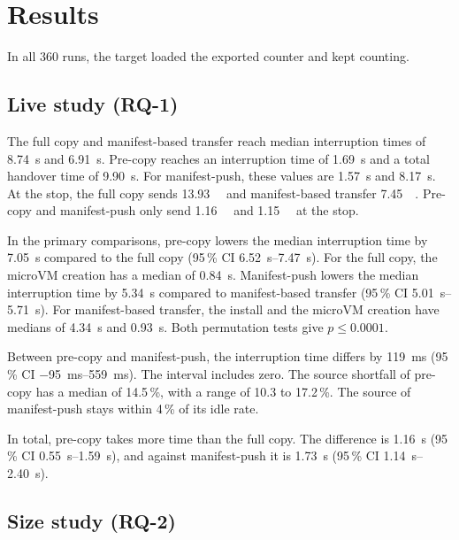 \section{Results}
\label{sec:results}

In all 360 runs, the target loaded the exported counter and kept counting.

\subsection{Live study (RQ-1)}

The full copy and manifest-based transfer reach median interruption times of \SI{8.74}{\second} and \SI{6.91}{\second}. Pre-copy reaches an interruption time of \SI{1.69}{\second} and a total handover time of \SI{9.90}{\second}. For manifest-push, these values are \SI{1.57}{\second} and \SI{8.17}{\second}. At the stop, the full copy sends \SI{13.93}{\mega\byte} and manifest-based transfer \SI{7.45}{\kilo\byte}. Pre-copy and manifest-push only send \SI{1.16}{\kilo\byte} and \SI{1.15}{\kilo\byte} at the stop.

In the primary comparisons, pre-copy lowers the median interruption time by \SI{7.05}{\second} compared to the full copy (95\,\% CI \SIrange{6.52}{7.47}{\second}). For the full copy, the microVM creation has a median of \SI{0.84}{\second}. Manifest-push lowers the median interruption time by \SI{5.34}{\second} compared to manifest-based transfer (95\,\% CI \SIrange{5.01}{5.71}{\second}). For manifest-based transfer, the install and the microVM creation have medians of \SI{4.34}{\second} and \SI{0.93}{\second}. Both permutation tests give $p \leq 0.0001$.

Between pre-copy and manifest-push, the interruption time differs by \SI{119}{\milli\second} (95\,\% CI \SIrange{-95}{559}{\milli\second}). The interval includes zero. The source shortfall of pre-copy has a median of 14.5\,\%, with a range of 10.3 to 17.2\,\%. The source of manifest-push stays within 4\,\% of its idle rate.

In total, pre-copy takes more time than the full copy. The difference is \SI{1.16}{\second} (95\,\% CI \SIrange{0.55}{1.59}{\second}), and against manifest-push it is \SI{1.73}{\second} (95\,\% CI \SIrange{1.14}{2.40}{\second}).

\subsection{Size study (RQ-2)}

